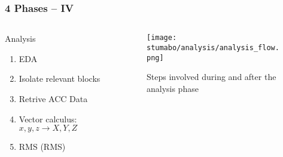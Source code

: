 \begin{frame}
    \frametitle{4 Phases -- IV}
    \vspace*{\fill}
    \begin{columns}[onlytextwidth, c]
        \begin{column}{.47\textwidth}
            \begin{exampleblock}{Analysis}
                \begin{enumerate}
                    \item \ac{EDA}
                    \item Isolate relevant blocks
                    \item Retrive ACC Data
                    \item Vector calculus: ${x, y, z} \rightarrow {X,Y,Z}$
                    \item \acl{RMS} (\acs{RMS})
                \end{enumerate}
            \end{exampleblock}
        \end{column}
        \begin{column}{.52\textwidth}
            \begin{figure}
                \texttt{[image: stumabo/analysis/analysis\_flow.png]}
                \caption{Steps involved during and after the analysis phase}
            \end{figure}
        \end{column}
    \end{columns}
    \vspace*{\fill}
\end{frame}

